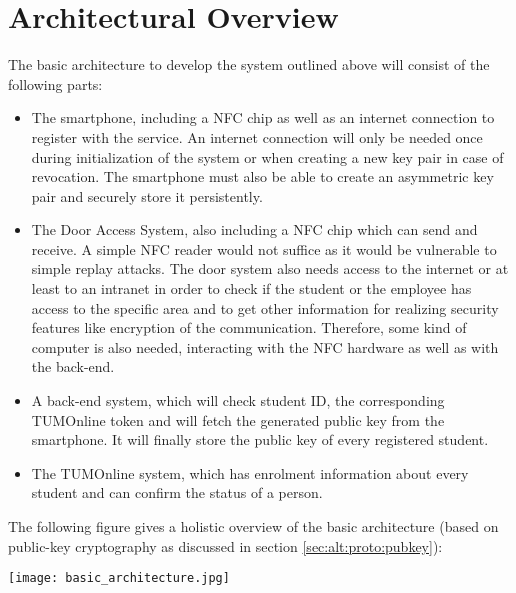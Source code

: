 \section{Architectural Overview}\label{sec:arch}



The basic architecture to develop the system outlined above will consist of the following parts:

\begin{itemize}
\item The smartphone, including a NFC chip as well as an internet connection to register with the service.
An internet connection will only be needed once during initialization of the system or when creating a new key pair in case of revocation.
The smartphone must also be able to create an asymmetric key pair and securely store it persistently.
\item The Door Access System, also including a NFC chip which can send and receive.
A simple NFC reader would not suffice as it would be vulnerable to simple replay attacks.
The door system also needs access to the internet or at least to an intranet in order to check if the student or the employee has access to the specific area and to get other information for realizing security features like encryption of the communication. Therefore, some kind of computer is also needed, interacting with the NFC hardware as well as with the back-end.
\item A back-end system, which will check student ID, the corresponding TUMOnline token and will fetch the generated public key from the smartphone. It will finally store the public key of every registered student.

\item The TUMOnline system, which has enrolment information about every student and can confirm the status of a person.
\end{itemize} 
%
The following figure gives a holistic overview of the basic architecture (based on public-key cryptography as discussed in section \ref{sec:alt:proto:pubkey}): \newline
 \begin{center}
	\texttt{[image: basic\_architecture.jpg]}
\end{center}



